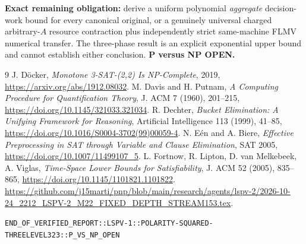 \documentclass[11pt]{article}
\begin{document}
\noindent\textbf{Exact remaining obligation:} derive a uniform polynomial \emph{aggregate} decision-work bound for every canonical original, or a genuinely universal charged arbitrary-$A$ resource contraction plus independently strict same-machine FLMV numerical transfer. The three-phase result is an explicit exponential upper bound and cannot establish either conclusion. \textbf{P versus NP OPEN.}

\begin{thebibliography}{9}
 J. D\"ocker, \emph{Monotone 3-SAT-(2,2) Is NP-Complete}, 2019, \url{https://arxiv.org/abs/1912.08032}.
 M. Davis and H. Putnam, \emph{A Computing Procedure for Quantification Theory}, J. ACM 7 (1960), 201--215, \url{https://doi.org/10.1145/321033.321034}.
 R. Dechter, \emph{Bucket Elimination: A Unifying Framework for Reasoning}, Artificial Intelligence 113 (1999), 41--85, \url{https://doi.org/10.1016/S0004-3702(99)00059-4}.
 N. E\'en and A. Biere, \emph{Effective Preprocessing in SAT through Variable and Clause Elimination}, SAT 2005, \url{https://doi.org/10.1007/11499107_5}.
 L. Fortnow, R. Lipton, D. van Melkebeek, A. Viglas, \emph{Time-Space Lower Bounds for Satisfiability}, J. ACM 52 (2005), 835--865, \url{https://doi.org/10.1145/1101821.1101822}.
 \url{https://github.com/j15marti/pnp/blob/main/research/agents/lspv-2/2026-10-24_2212_LSPV-2_M22_FIXED_DEPTH_STREAM153.tex}.
\end{thebibliography}

\noindent\texttt{END\_OF\_VERIFIED\_REPORT::LSPV-1::POLARITY-SQUARED-THREELEVEL323::P\_VS\_NP\_OPEN}
\end{document}
